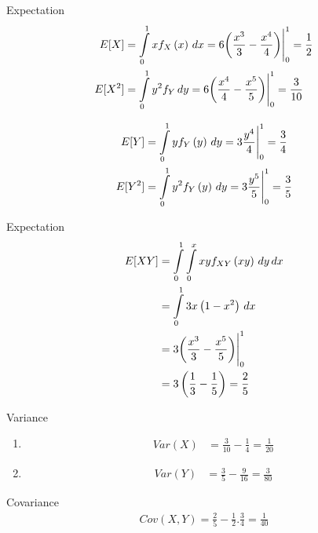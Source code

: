 \documentclass{beamer}
\providecommand{\brak}[1]{\ensuremath{\left(#1\right)}}
\begin{document}
\begin{frame}{Expectation}
    \begin{align}
        E[X]&=\Int_{0}^{1}x f_{X}\brak{x}\,dx=6{\brak{\frac{x^3}{3}-\frac{x^4}{4}}}\Biggr|_{0}^{1}=\frac{1}{2}\\
        E[X^2]&=\Int_{0}^{1} y^2 f_{Y}\,dy=6{\brak{\frac{x^4}{4}-\frac{x^5}{5}}}\Biggr|_{0}^{1}=\frac{3}{10}
    \end{align}

    \begin{align}
        E[Y]&=\Int_{0}^{1}y f_{Y}\brak{y}\,dy=3{\frac{y^4}{4}}\Biggr|_{0}^{1}=\frac{3}{4}\\
E[Y^2]&=\Int_{0}^{1}y^2 f_{Y}\brak{y}\,dy=3{\frac{y^5}{5}}\Biggr|_{0}^{1}=\frac{3}{5}
    \end{align}
\end{frame}

\begin{frame}{Expectation}
    \begin{align}
      E[XY]&=\Int_{0}^{1} \Int_{0}^{x}xy f_{XY}\brak{xy} \,dy\,dx\\
      &=\Int_{0}^{1} 3x\brak{1-x^2}\,dx\\
      &=3 {\brak{\frac{x^3}{3}-\frac{x^5}{5}}}\Biggr|_{0}^{1}\\
      &=3\brak{\frac{1}{3}-\frac{1}{5}}=\frac{2}{5}
    \end{align}
    
\end{frame}

\begin{frame}{Variance}
\begin{enumerate}
    \item 
    \begin{align}
    Var\brak{X}&=\frac{3}{10}-\frac{1}{4}=\boxed{\frac{1}{20}}
\end{align}
\item
\begin{align}
    Var\brak{Y}&=\frac{3}{5}-\frac{9}{16}=\boxed{\frac{3}{80}}
\end{align}
\end{enumerate}
\end{frame}

\begin{frame}{Covariance}
\begin{align}
    Cov\brak{X,Y}=\frac{2}{5}-\frac{1}{2}.\frac{3}{4}=\boxed{\frac{1}{40}}
\end{align}
    
\end{frame}
\end{document}
